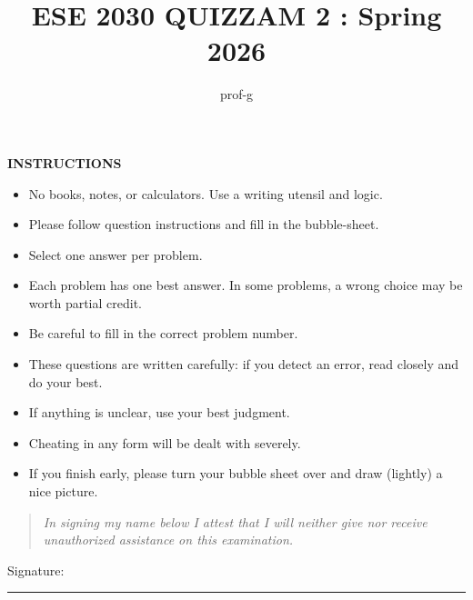 \documentclass[12pt]{amsart}
\title{ESE 2030 QUIZZAM 2 : Spring 2026}
\author{prof-g}
\begin{document}
\thispagestyle{firstpage}

\maketitle

\begin{center}
    {\bf INSTRUCTIONS}
\end{center}

\begin{itemize}
\item 
No books, notes, or calculators. Use a writing utensil and logic. 

\item 
Please follow question instructions and fill in the bubble-sheet. 

\item 
Select one answer per problem.

\item 
Each problem has one best answer. In some problems, a wrong choice may be worth partial credit. 

\item 
Be careful to fill in the correct problem number. 

\item 
These questions are written carefully: if you detect an error, read closely and do your best.

\item 
If anything is unclear, use your best judgment. 

\item 
Cheating in any form will be dealt with severely. 

\item 
If you finish early, please turn your bubble sheet over and draw (lightly) a nice picture. 

\end{itemize}

\vspace{1in}
\begin{center}
\begin{quote}
    \large
{\em In signing my name below I attest that I will neither give nor receive unauthorized assistance on this examination.}
    \normalsize
\end{quote}
\vspace{1in}

Signature: \rule{3in}{0.4pt}
\end{center}

\newpage
\end{document}
